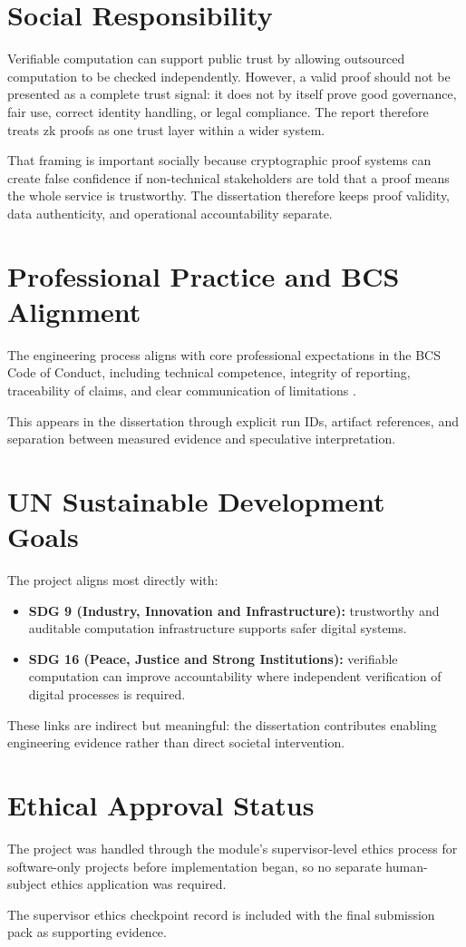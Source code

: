 \section{Social Responsibility}

Verifiable computation can support public trust by allowing outsourced
computation to be checked independently. However, a valid proof should not be
presented as a complete trust signal: it does not by itself prove good
governance, fair use, correct identity handling, or legal compliance. The report
therefore treats zk proofs as one trust layer within a wider system.

That framing is important socially because cryptographic proof systems can create
false confidence if non-technical stakeholders are told that a proof means the
whole service is trustworthy. The dissertation therefore keeps proof validity,
data authenticity, and operational accountability separate.

\section{Professional Practice and BCS Alignment}

The engineering process aligns with core professional expectations in the BCS
Code of Conduct, including technical competence, integrity of reporting,
traceability of claims, and clear communication of limitations \cite{bcscode2024}.

This appears in the dissertation through explicit run IDs, artifact references,
and separation between measured evidence and speculative interpretation.

\section{UN Sustainable Development Goals}

The project aligns most directly with:

\begin{itemize}
\item \textbf{SDG 9 (Industry, Innovation and Infrastructure):} trustworthy and
auditable computation infrastructure supports safer digital systems.
\item \textbf{SDG 16 (Peace, Justice and Strong Institutions):} verifiable
computation can improve accountability where independent verification of digital
processes is required.
\end{itemize}

These links are indirect but meaningful: the dissertation contributes enabling
engineering evidence rather than direct societal intervention.

\section{Ethical Approval Status}

The project was handled through the module's supervisor-level ethics process for
software-only projects before implementation began, so no separate human-subject
ethics application was required.

The supervisor ethics checkpoint record is included with the final submission
pack as supporting evidence.
